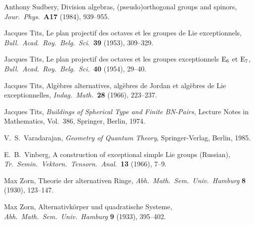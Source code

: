 \begin{thebibliography}{10}
 Anthony Sudbery, Division algebras, (pseudo)orthogonal   
groups and spinors, {\sl Jour.\ Phys.\ }{\bf A17} (1984), 939--955.   
  
 Jacques Tits, Le plan projectif des octaves et les groupes 
de Lie exceptionnels, {\sl Bull.\ Acad.\ Roy.\ Belg.\ Sci.\ }{\bf 39} (1953), 
309--329. 
 
 Jacques Tits, Le plan projectif des octaves et les groupes 
exceptionnels ${\rm E}_6$ et ${\rm E}_7$, {\sl Bull.\ Acad.\ Roy.\ Belg.\ 
Sci.\ }{\bf 40} (1954), 29--40. 
 
 Jacques Tits, Alg\`ebres alternatives, alg\`ebres de    
Jordan et alg\`ebres de Lie exceptionnelles, {\sl Indag.\ Math.\ }{\bf 28} 
(1966), 223--237.   
 
 Jacques Tits, {\sl Buildings of Spherical Type 
and Finite BN-Pairs, } Lecture Notes in Mathematics, Vol.\ 386,
Springer, Berlin, 1974.  

 V.\ S.\ Varadarajan, {\sl Geometry of Quantum 
Theory}, Springer-Verlag, Berlin, 1985.   

 E.\ B.\ Vinberg, A construction of exceptional
simple Lie groups (Russian), {\sl Tr.\ Semin.\ Vektorn.\ Tensorn.\ 
Anal.\ }{\bf 13} (1966), 7--9.

 Max Zorn, Theorie der alternativen Ringe,    
{\sl Abh.\ Math.\ Sem.\ Univ.\ Hamburg} {\bf 8} (1930), 123--147.   
  
\bibitem{Zorn2} Max Zorn, Alternativk\"orper und quadratische Systeme,   
{\sl Abh.\ Math.\ Sem.\ Univ.\ Hamburg} {\bf 9} (1933), 395--402.   
  
\end{thebibliography}   
   
   
   
   
   
